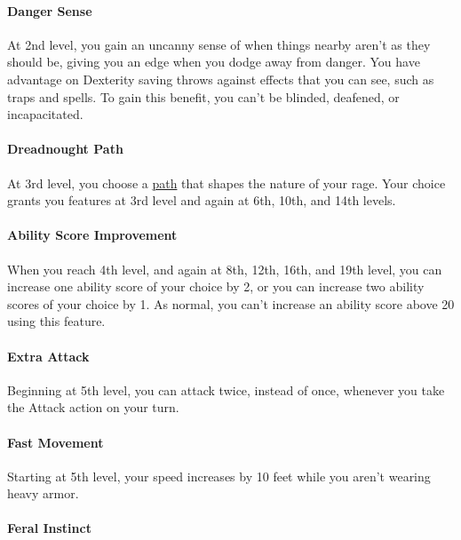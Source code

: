 \paragraph{Danger Sense}\label{dreadnought-feature-danger-sense}

At 2nd level, you gain an uncanny sense of when things nearby aren't as
they should be, giving you an edge when you dodge away from danger. You
have advantage on Dexterity saving throws against effects that you can
see, such as traps and spells. To gain this benefit, you can't be
blinded, deafened, or incapacitated.

\paragraph{Dreadnought Path}\label{dreadnought-feature-path}

At 3rd level, you choose a \hyperref[dreadnought-subclasses]{path} that
shapes the nature of your rage. Your choice grants you features at 3rd
level and again at 6th, 10th, and 14th levels.

\paragraph{Ability Score Improvement}\label{dreadnought-feature-asi}

When you reach 4th level, and again at 8th, 12th, 16th, and 19th level,
you can increase one ability score of your choice by 2, or you can
increase two ability scores of your choice by 1. As normal, you can't
increase an ability score above 20 using this feature.

\paragraph{Extra Attack}\label{dreadnought-feature-extra-attack}

Beginning at 5th level, you can attack twice, instead of once, whenever
you take the Attack action on your turn.

\paragraph{Fast Movement}\label{dreadnought-feature-fast-movement}

Starting at 5th level, your speed increases by 10 feet while you aren't
wearing heavy armor.

\paragraph{Feral Instinct}\label{dreadnought-feature-feral-instinct}

